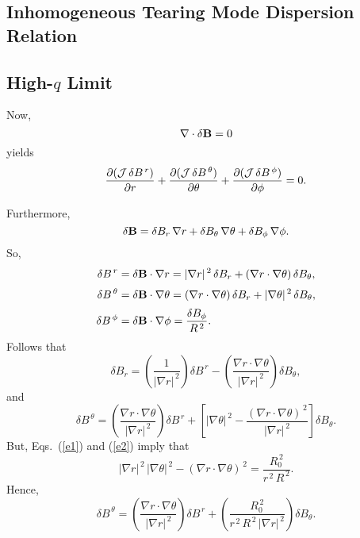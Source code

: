 \documentclass[notitlepage,12pt]{article}
\begin{document}
\subsection{Inhomogeneous Tearing Mode Dispersion Relation}
\subsection{High-$q$ Limit}
Now,
\begin{equation}
\nabla \cdot \delta{\bf B}=0
\end{equation}
yields
\begin{equation}\label{e38}
\frac{\partial ({\cal J}\,\delta B^{\,r})}{\partial r}+ \frac{\partial({\cal J}\,\delta B^{\,\theta})}{\partial\theta} +\frac{\partial({\cal J}\,\delta B^{\,\phi})}{\partial\phi} =0.
\end{equation}

Furthermore,
\begin{equation}
\delta {\bf B} = \delta B_r\,\nabla r + \delta B_\theta\,\nabla\theta
+\delta B_\phi\,\nabla\phi.
\end{equation}
So,
\begin{align}
\delta B^{\,r} &=\delta {\bf B}\cdot \nabla r = |\nabla r|^{\,2}\,\delta  B_r+
(\nabla r\cdot\nabla\theta)\,\delta B_\theta,\\[0.5ex]
\delta B^{\,\theta} &= \delta {\bf B}\cdot\nabla\theta = (\nabla r\cdot\nabla\theta)\,\delta B_r
+|\nabla \theta|^{\,2}\,\delta B_\theta,\\[0.5ex]
\delta B^{\,\phi}&=\delta {\bf B}\cdot\nabla\phi = \frac{\delta B_\phi}{R^{\,2}}.
\end{align}
Follows that
\begin{equation}\label{e43}
\delta B_r = \left(\frac{1}{|\nabla r|^{\,2}}\right)\delta B^{\,r}-\left(
\frac{\nabla r\cdot\nabla\theta}{|\nabla r|^{\,2}}\right)\delta B_\theta,
\end{equation}
and
\begin{equation}\label{e44}
\delta B^{\,\theta}=\left(\frac{\nabla r\cdot\nabla\theta}{|\nabla r|^{\,2}}\right)
\delta B^{\,r}+ \left[|\nabla\theta|^{\,2}-\frac{(\nabla r\cdot\nabla\theta)^{\,2}}{|\nabla r|^{\,2}}\right]\delta B_\theta.
\end{equation}
But, Eqs.~(\ref{e1}) and (\ref{e2}) imply that
\begin{equation}
|\nabla r|^{\,2}\,|\nabla\theta|^{\,2}-(\nabla r\cdot\nabla\theta)^{\,2} = \frac{R_0^{\,2}}{r^{\,2}\,R^{\,2}}.
\end{equation}
Hence,
\begin{equation}\label{e46}
\delta B^{\,\theta} = \left(\frac{\nabla r\cdot\nabla\theta}{|\nabla r|^{\,2}}\right)
\delta B^{\,r}+ \left(\frac{R_0^{\,2}}{r^{\,2}\,R^{\,2}\,|\nabla r|^{\,2}}\right)\delta B_\theta.
\end{equation}
\end{document}
